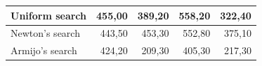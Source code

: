 \documentclass[english, 12pt, a4paper, sci, utf8, a-1b, online, table]{aaltothesis}
\begin{document}
\begin{table}[H]
\begin{tabular}{|l|r|r|r|r|}
    Uniform search                                                             & \cellcolor[HTML]{FCEDEC}455,00                           & 389,20                                                    & 558,20                                                    & \cellcolor[HTML]{F0F9F5}322,40                            \\ \hline
    Newton's search                                                             & \cellcolor[HTML]{F0F9F5}443,50                           & 453,30                                                    & 552,80                                                    & 375,10                                                    \\ \hline
    Armijo's search                                                              & \cellcolor[HTML]{7BC9A3}424,20                           & \cellcolor[HTML]{7BC9A3}209,30                            & \cellcolor[HTML]{7BC9A3}405,30                            & \cellcolor[HTML]{7BC9A3}217,30                            \\ \hline
    \end{tabular}
\end{table}
\end{document}
